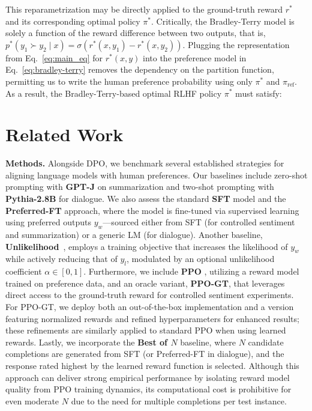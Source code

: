 This reparametrization may be directly applied to the ground-truth reward $r^*$ and its corresponding optimal policy $\pi^*$. Critically, the Bradley-Terry model is solely a function of the reward difference between two outputs, that is, ${p^*(y_1 \succ y_2 \mid x) = \sigma(r^*(x, y_1) - r^*(x, y_2))}$. Plugging the representation from Eq.~\ref{eq:main_eq} for $r^*(x, y)$ into the preference model in Eq.~\ref{eq:bradley-terry} removes the dependency on the partition function, permitting us to write the human preference probability using only $\pi^*$ and $\pi_\text{ref}$. As a result, the Bradley-Terry-based optimal RLHF policy $\pi^*$ must satisfy:

\section{Related Work}

\textbf{Methods.} Alongside DPO, we benchmark several established strategies for aligning language models with human preferences. Our baselines include zero-shot prompting with \textbf{GPT-J} \citep{gpt-j} on summarization and two-shot prompting with \textbf{Pythia-2.8B} \citep{biderman2023pythia} for dialogue. We also assess the standard \textbf{SFT} model and the \textbf{Preferred-FT} approach, where the model is fine-tuned via supervised learning using preferred outputs $y_w$—sourced either from SFT (for controlled sentiment and summarization) or a generic LM (for dialogue). Another baseline, \textbf{Unlikelihood}~\citep{welleck2019neural}, employs a training objective that increases the likelihood of $y_w$ while actively reducing that of $y_l$, modulated by an optional unlikelihood coefficient $\alpha\in[0,1]$. Furthermore, we include \textbf{PPO} \citep{schulman2017proximal}, utilizing a reward model trained on preference data, and an oracle variant, \textbf{PPO-GT}, that leverages direct access to the ground-truth reward for controlled sentiment experiments. For PPO-GT, we deploy both an out-of-the-box implementation \cite{leandro_von_werra_2023_7790115} and a version featuring normalized rewards and refined hyperparameters for enhanced results; these refinements are similarly applied to standard PPO when using learned rewards. Lastly, we incorporate the \textbf{Best of $N$} baseline, where $N$ candidate completions are generated from SFT (or Preferred-FT in dialogue), and the response rated highest by the learned reward function is selected. Although this approach can deliver strong empirical performance by isolating reward model quality from PPO training dynamics, its computational cost is prohibitive for even moderate $N$ due to the need for multiple completions per test instance.

